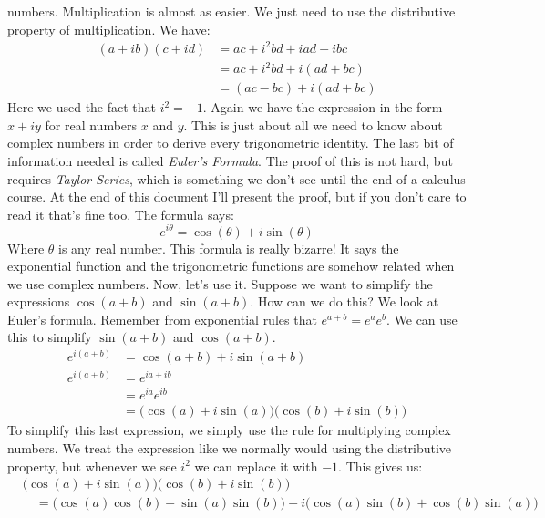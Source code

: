 \documentclass{article}
\theoremstyle{normal}
\theoremstyle{plain}
\begin{document}
    numbers. Multiplication is almost as easier. We just need to use the
    distributive property of multiplication. We have:
    \begin{align}
        (a+ib)(c+id)
            &=ac+i^{2}bd+iad+ibc\\
            &=ac+i^{2}bd+i(ad+bc)\\
            &=(ac-bc)+i(ad+bc)
    \end{align}
    Here we used the fact that $i^{2}=-1$. Again we have the expression in the
    form $x+iy$ for real numbers $x$ and $y$. This is just about all we need to
    know about complex numbers in order to derive every trigonometric identity.
    The last bit of information needed is called \textit{Euler's Formula}.
    The proof of this is not hard, but requires \textit{Taylor Series}, which
    is something we don't see until the end of a calculus course. At the end of
    this document I'll present the proof, but if you don't care to read it
    that's fine too. The formula says:
    \begin{equation}
        e^{i\theta}=\cos(\theta)+i\sin(\theta)
    \end{equation}
    Where $\theta$ is any real number. This formula is really bizarre! It says
    the exponential function and the trigonometric functions are somehow
    related when we use complex numbers. Now, let's use it. Suppose we want to
    simplify the expressions $\cos(a+b)$ and $\sin(a+b)$. How can we do this?
    We look at Euler's formula. Remember from exponential rules that
    $e^{a+b}=e^{a}e^{b}$. We can use this to simplify $\sin(a+b)$ and
    $\cos(a+b)$.
    \begin{align}
        e^{i(a+b)}&=\cos(a+b)+i\sin(a+b)\tag{Euler's Formula}\\
        e^{i(a+b)}&=e^{ia+ib}\tag{Distribute $i$}\\
            &=e^{ia}e^{ib}\tag{Exponential Property}\\
            &=\big(\cos(a)+i\sin(a)\big)\big(\cos(b)+i\sin(b)\big)
                \tag{Euler's Formula}
    \end{align}
    To simplify this last expression, we simply use the rule for multiplying
    complex numbers. We treat the expression like we normally would using the
    distributive property, but whenever we see $i^{2}$ we can replace it with
    $-1$. This gives us:
    \begin{align}
        &\big(\cos(a)+i\sin(a)\big)\big(\cos(b)+i\sin(b)\big)\nonumber\\
        &\quad=\big(\cos(a)\cos(b)-\sin(a)\sin(b)\big)+
            i\big(\cos(a)\sin(b)+\cos(b)\sin(a)\big)
    \end{align}
\end{document}
